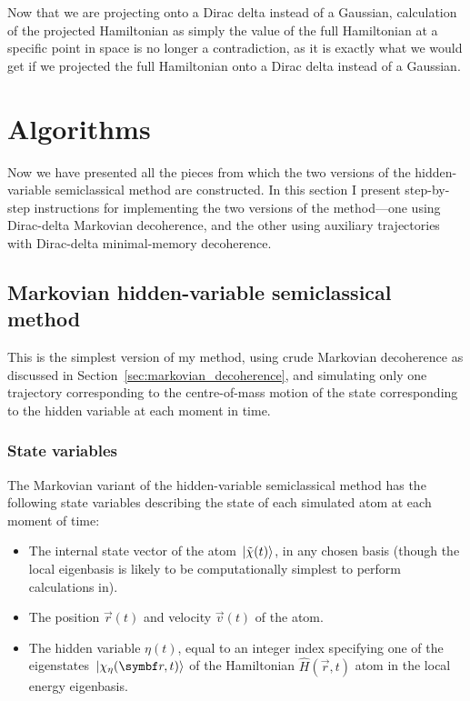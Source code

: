Now that we are projecting onto a Dirac delta instead of a Gaussian, calculation of the projected Hamiltonian as simply the value of the full Hamiltonian at a specific point in space is no longer a contradiction, as it is exactly what we would get if we projected the full Hamiltonian onto a Dirac delta instead of a Gaussian.


\section{Algorithms}\label{sec:HVSC_algorithm}

Now we have presented all the pieces from which the two versions of the hidden-variable semiclassical method are constructed. In this section I present step-by-step instructions for implementing the two versions of the method---one using Dirac-delta Markovian decoherence, and the other using auxiliary trajectories with Dirac-delta minimal-memory decoherence.

\subsection{Markovian hidden-variable semiclassical method}\label{sec:algo_markovian}
This is the simplest version of my method, using crude Markovian decoherence as discussed in Section~\ref{sec:markovian_decoherence}, and simulating only one trajectory corresponding to the centre-of-mass motion of the state corresponding to the hidden variable at each moment in time.

\subsubsection{State variables}
The Markovian variant of the hidden-variable semiclassical method has the following state variables describing the state of each simulated atom at each moment of time:
\begin{itemize}
    \item The internal state vector of the atom $\ket{\tilde\chi(t)}$, in any chosen basis (though the local eigenbasis is likely to be computationally simplest to perform calculations in).
    \item The position $\vec r(t)$ and velocity $\vec v(t)$ of the atom.
    \item The hidden variable $\eta(t)$, equal to an integer index specifying one of the eigenstates $\ket{\chi_\eta(\vec r, t)}$ of the Hamiltonian $\hat H(\vec r, t)$ atom in the local energy eigenbasis.
\end{itemize}

